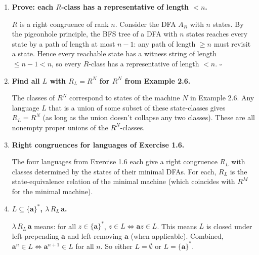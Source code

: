 \begin{enumerate}[{2.}1.]
Counterexample for strict: Let $L_1=\{\lambda\}$, $L_2=\{\mathbf{a}\}$ over $\{\mathbf{a}\}^*$. $R_{L_1}$ has 2 classes: $\{\lambda\}$ and $\mathbf{a}^+$. $R_{L_2}$ has 3 classes: $\{\lambda\}$, $\{\mathbf{a}\}$, $\mathbf{a}^{\geq 2}$. $R_{L_1}\cap R_{L_2}$ has 3 classes. But $L_1\cap L_2=\emptyset$, so $R_{L_1\cap L_2}$ has 1 class (all strings equivalent). They differ.

\item \textbf{Prove: each $R$-class has a representative of length $<n$.}

$R$ is a right congruence of rank $n$. Consider the DFA $A_R$ with $n$ states. By the pigeonhole principle, the BFS tree of a DFA with $n$ states reaches every state by a path of length at most $n-1$: any path of length $\geq n$ must revisit a state. Hence every reachable state has a witness string of length $\leq n-1<n$, so every $R$-class has a representative of length $<n$. $\square$

\item \textbf{Find all $L$ with $R_L=R^N$ for $R^N$ from Example 2.6.}

The classes of $R^N$ correspond to states of the machine $N$ in Example 2.6. Any language $L$ that is a union of some subset of these state-classes gives $R_L=R^N$ (as long as the union doesn't collapse any two classes). These are all nonempty proper unions of the $R^N$-classes.

\item \textbf{Right congruences for languages of Exercise 1.6.}

The four languages from Exercise 1.6 each give a right congruence $R_L$ with classes determined by the states of their minimal DFAs. For each, $R_L$ is the state-equivalence relation of the minimal machine (which coincides with $R^M$ for the minimal machine).

\item \textbf{$L\subseteq\{\mathbf{a}\}^*$, $\lambda\,R_L\,\mathbf{a}$.}

$\lambda\,R_L\,\mathbf{a}$ means: for all $z\in\{\mathbf{a}\}^*$, $z\in L\Leftrightarrow\mathbf{a}z\in L$. This means $L$ is closed under left-prepending $\mathbf{a}$ and left-removing $\mathbf{a}$ (when applicable). Combined, $\mathbf{a}^n\in L\Leftrightarrow\mathbf{a}^{n+1}\in L$ for all $n$. So either $L=\emptyset$ or $L=\{\mathbf{a}\}^*$.


\end{enumerate}
